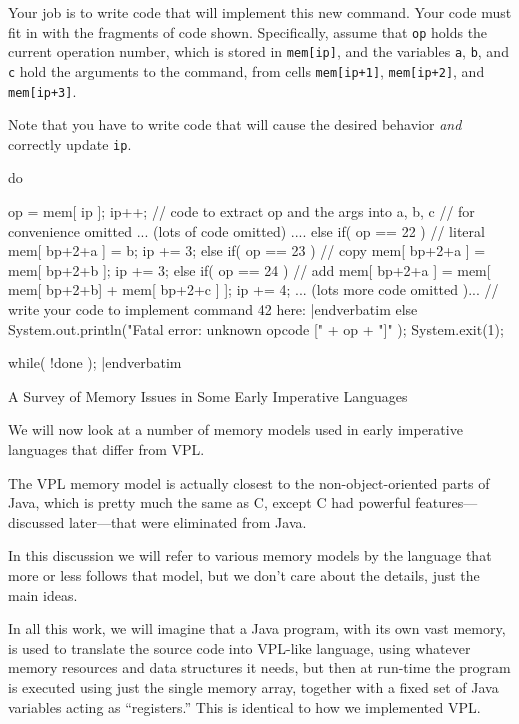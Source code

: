 Your job is to write code  that will implement this new command. 
Your code must fit in with the fragments of code shown.  Specifically, assume that
{\tt op} holds the current operation number, which is stored in
{\tt mem[ip]}, and the variables {\tt a}, {\tt b}, and {\tt c}
hold the arguments to the command, from cells {\tt mem[ip+1]}, {\tt mem[ip+2]}, and
{\tt mem[ip+3]}.
\medskip

Note that you have to write code that will cause the desired behavior {\it and\/}
correctly update {\tt ip}.
\medskip

{\baselineskip

\verbatim
    do{
      op = mem[ ip ];  ip++;
      // code to extract op and the args into a, b, c 
      // for convenience omitted    
      ...  (lots  of code omitted) ....
      else if( op == 22 )    // literal
      {
        mem[ bp+2+a ] = b;
        ip += 3;
      }
      else if( op == 23 )  // copy
      {
        mem[ bp+2+a ] = mem[ bp+2+b ];
        ip += 3;
      }
      else if( op == 24 )  // add
      {
        mem[ bp+2+a ] = mem[ mem[ bp+2+b] + mem[ bp+2+c ] ];
        ip += 4;
      }
      ... (lots more code omitted )...
      // write your code to implement command 42 here:
|endverbatim
\vfil
\verbatim
      else
      {
        System.out.println("Fatal error: unknown opcode [" + op + "]" );
        System.exit(1);
      }
       
    }while( !done );
|endverbatim
\par
}
\eject


{\bigboldfont A Survey of Memory Issues in Some Early Imperative Languages}
\medskip

We will now look at a number of memory models used in early imperative languages that differ from
VPL.
\medskip

   The VPL memory model is actually closest to the non-object-oriented parts of Java,
   which is pretty much the same as C, except C had powerful features---discussed later---that
   were eliminated from Java.
\medskip
\Outdent

In this discussion we will refer to various memory
models by the language that more or
less follows that model, but we don't care about the details,
just the main ideas.
\medskip

In all this work, we will imagine that a Java program, with its own
vast memory, is used to translate the source code into VPL-like
language, using whatever memory resources and data structures it
needs, but then at run-time the program is executed using just the 
single memory array, together with a fixed set of Java variables
acting as ``registers.''  This is identical to how we implemented VPL.
\medskip

